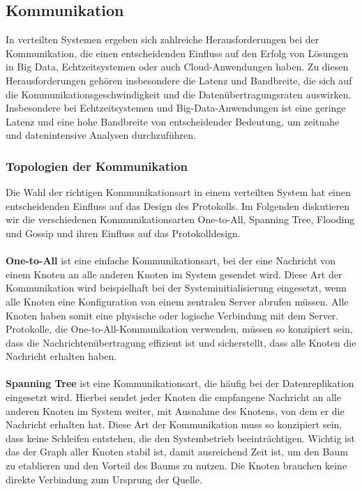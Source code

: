 \subsection{Kommunikation}

In verteilten Systemen ergeben sich zahlreiche Herausforderungen bei der Kommunikation, die einen entscheidenden Einfluss auf den Erfolg von Lösungen in Big Data, Echtzeitsystemen oder auch Cloud-Anwendungen haben. Zu diesen Herausforderungen gehören insbesondere die Latenz und Bandbreite, die sich auf die Kommunikationsgeschwindigkeit und die Datenübertragungsraten auswirken. Insbesondere bei Echtzeitsystemen und Big-Data-Anwendungen ist eine geringe Latenz und eine hohe Bandbreite von entscheidender Bedeutung, um zeitnahe und datenintensive Analysen durchzuführen.
\subsubsection{Topologien der Kommunikation}
Die Wahl der richtigen Kommunikationsart in einem verteilten System hat einen entscheidenden Einfluss auf das Design des Protokolls. Im Folgenden diskutieren wir die verschiedenen Kommunikationsarten One-to-All, Spanning Tree, Flooding und Gossip und ihren Einfluss auf das Protokolldesign.
\\\\
\textbf{One-to-All} ist eine einfache Kommunikationsart, bei der eine Nachricht von einem Knoten an alle anderen Knoten im System gesendet wird. Diese Art der Kommunikation wird beispielhaft bei der Systeminitialisierung eingesetzt, wenn alle Knoten eine Konfiguration von einem zentralen Server abrufen müssen. Alle Knoten haben somit eine physische oder logische Verbindung mit dem Server. Protokolle, die One-to-All-Kommunikation verwenden, müssen so konzipiert sein, dass die Nachrichtenübertragung effizient ist und sicherstellt, dass alle Knoten die Nachricht erhalten haben.
\\\\
\textbf{Spanning Tree} ist eine Kommunikationsart, die häufig bei der Datenreplikation eingesetzt wird. Hierbei sendet jeder Knoten die empfangene Nachricht an alle anderen Knoten im System weiter, mit Ausnahme des Knotens, von dem er die Nachricht erhalten hat. Diese Art der Kommunikation muss so konzipiert sein, dass keine Schleifen entstehen, die den Systembetrieb beeinträchtigen. Wichtig ist das der Graph aller Knoten stabil ist, damit ausreichend Zeit ist, um den Baum zu etablieren und den Vorteil des Baums zu nutzen. Die Knoten brauchen keine direkte Verbindung zum Ursprung der Quelle.

